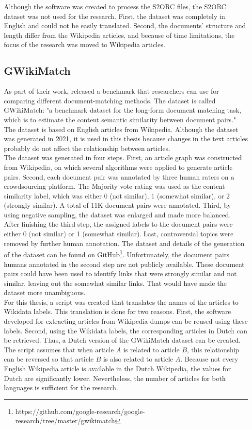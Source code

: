 Although the software was created to process the S2ORC files, the S2ORC dataset was not used for the research. First, the dataset was completely in English and could not be easily translated. Second, the documents' structure and length differ from the Wikipedia articles, and because of time limitations, the focus of the research was moved to Wikipedia articles.


\subsection{GWikiMatch}
\label{sectWikiMatch}
As part of their work, \citet{512Tokens} released a benchmark that researchers can use for comparing different document-matching methods. The dataset is called GWikiMatch: "a benchmark dataset for the long-form document matching task, which is to estimate the content semantic similarity between document pairs." The dataset is based on English articles from Wikipedia. Although the dataset was generated in 2021, it is used in this thesis because changes in the text articles probably do not affect the relationship between articles.\\

The dataset was generated in four steps. First, an article graph was constructed from Wikipedia, on which several algorithms were applied to generate article pairs. Second, each document pair was annotated by three human raters on a crowdsourcing platform. The Majority vote rating was used as the content similarity label, which was either 0 (not similar), 1 (somewhat similar), or 2 (strongly similar). A total of 11K document pairs were annotated. Third, by using negative sampling, the dataset was enlarged and made more balanced. After finishing the third step, the assigned labels to the document pairs were either 0 (not similar) or 1 (somewhat similar). Last, controversial topics were removed by further human annotation. The dataset and details of the generation of the dataset can be found on GitHub\footnote{https://github.com/google-research/google-research/tree/master/gwikimatch}. Unfortunately, the document pairs humans annotated in the second step are not publicly available. These document pairs could have been used to identify links that were strongly similar and not similar, leaving out the somewhat similar links. That would have made the dataset more unambiguous.  \\

For this thesis, a script was created that translates the names of the articles to Wikidata labels. This translation is done for two reasons. First, the software developed for extracting articles from Wikipedia dumps can be reused using these labels. Second, using the Wikidata labels, the corresponding articles in Dutch can be retrieved. Thus, a Dutch version of the GWikiMatch dataset can be created. The script assumes that when article $A$ is related to article $B$, this relationship can be reversed so that article $B$ is also related to article $A$. Because not every English Wikipedia article is available in the Dutch Wikipedia, the values for Dutch are significantly lower. Nevertheless, the number of articles for both languages is sufficient for the research.

